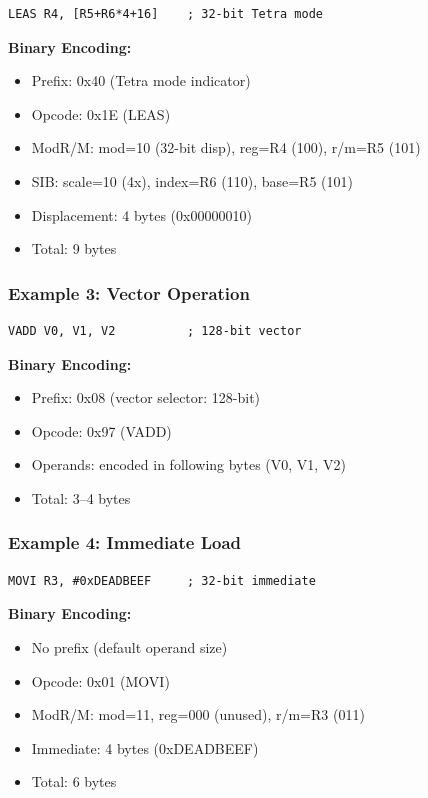 \documentclass[12pt]{article}
\begin{document}
\begin{lstlisting}
LEAS R4, [R5+R6*4+16]    ; 32-bit Tetra mode
\end{lstlisting}

\textbf{Binary Encoding:}
\begin{itemize}
    \item Prefix: 0x40 (Tetra mode indicator)
    \item Opcode: 0x1E (LEAS)
    \item ModR/M: mod=10 (32-bit disp), reg=R4 (100), r/m=R5 (101)
    \item SIB: scale=10 (4x), index=R6 (110), base=R5 (101)
    \item Displacement: 4 bytes (0x00000010)
    \item Total: 9 bytes
\end{itemize}

\subsubsection{Example 3: Vector Operation}

\begin{lstlisting}
VADD V0, V1, V2          ; 128-bit vector
\end{lstlisting}

\textbf{Binary Encoding:}
\begin{itemize}
    \item Prefix: 0x08 (vector selector: 128-bit)
    \item Opcode: 0x97 (VADD)
    \item Operands: encoded in following bytes (V0, V1, V2)
    \item Total: 3--4 bytes
\end{itemize}

\subsubsection{Example 4: Immediate Load}

\begin{lstlisting}
MOVI R3, #0xDEADBEEF     ; 32-bit immediate
\end{lstlisting}

\textbf{Binary Encoding:}
\begin{itemize}
    \item No prefix (default operand size)
    \item Opcode: 0x01 (MOVI)
    \item ModR/M: mod=11, reg=000 (unused), r/m=R3 (011)
    \item Immediate: 4 bytes (0xDEADBEEF)
    \item Total: 6 bytes
\end{itemize}
\end{document}
